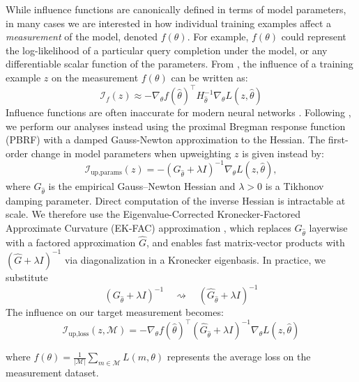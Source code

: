 \documentclass{article}
\theoremstyle{plain}
\theoremstyle{definition}
\theoremstyle{remark}
\begin{document}
While influence functions are canonically defined in terms of model parameters, in many cases we are interested in how individual training examples affect a \textit{measurement} of the model, denoted $f(\theta)$. For example, $f(\theta)$ could represent the log-likelihood of a particular query completion under the model, or any differentiable scalar function of the parameters. From \citet{grosse2023studying}, the influence of a training example $z$ on the measurement $f(\theta)$ can be written as:
\begin{equation}
\mathcal{I}_{f}(z) \approx -\nabla_{\theta} f(\hat{\theta})^{\top} 
H_{\hat{\theta}}^{-1}
\nabla_{\theta} L(z, \hat{\theta})
\end{equation}
Influence functions are often inaccurate for modern neural networks \citep{bae2022if}. Following \citet{bae2022if, ruis2024procedural}, we perform our analyses instead using the proximal Bregman response function (PBRF) with a damped Gauss-Newton approximation to the Hessian. The first-order change in
model parameters when upweighting $z$ is given instead by:
\begin{equation}
  \mathcal{I}_{\text{up,params}}(z)
  = -(G_{\hat\theta} + \lambda I)^{-1}\nabla_\theta L(z,\hat\theta),
  \label{eq:pbrf}
\end{equation}
where $G_{\hat\theta}$ is the empirical Gauss--Newton Hessian and $\lambda > 0$ is a Tikhonov damping parameter. Direct computation of the inverse Hessian is intractable at scale. We therefore use
the Eigenvalue-Corrected Kronecker-Factored Approximate Curvature (EK-FAC)
approximation \citep{grosse2023studying}, which replaces
$G_{\hat\theta}$ layerwise with a factored approximation $\hat{G}$, and enables fast
matrix-vector products with $(\hat{G}+\lambda I)^{-1}$ via diagonalization in a
Kronecker eigenbasis. In practice, we substitute
\begin{equation}
(G_{\hat\theta} + \lambda I)^{-1}
\quad \rightsquigarrow \quad
(\hat{G}_{\hat\theta} + \lambda I)^{-1}
\end{equation}
The influence on our target measurement becomes:
\begin{equation}
\mathcal{I}_{\text{up,loss}}(z, \mathcal{M}) = -\nabla_\theta f(\hat{\theta})^\top(\hat G_{\hat\theta} + \lambda I)^{-1}\nabla_\theta L(z,\hat\theta)
\label{eq:iuploss}
\end{equation}

where $f(\theta) = \frac{1}{|\mathcal{M}|} \sum_{m \in \mathcal{M}} L(m, \theta)$ represents the average loss on the measurement dataset.
\end{document}
